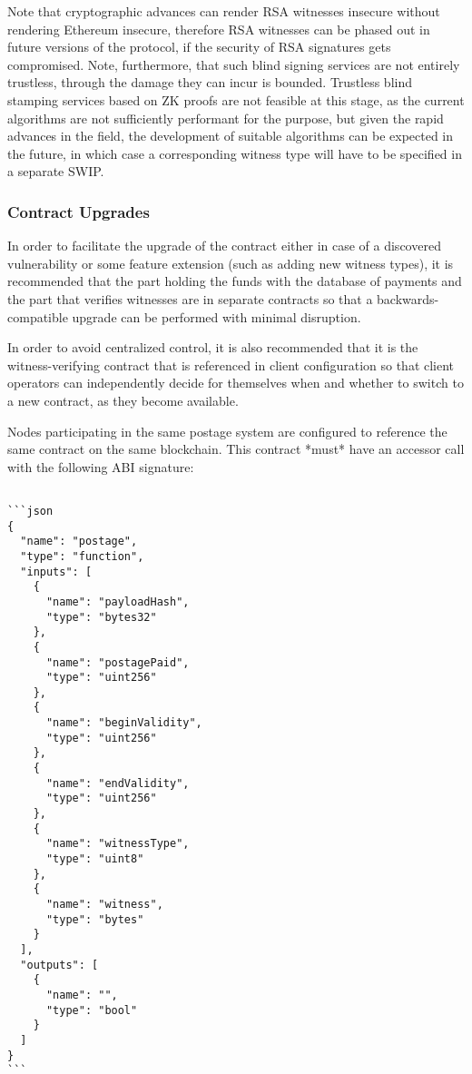 Note that cryptographic advances can render RSA witnesses insecure without rendering Ethereum insecure, therefore RSA witnesses can be phased out in future versions of the protocol, if the security of RSA signatures gets compromised. Note, furthermore, that such blind signing services are not entirely trustless, through the damage they can incur is bounded. Trustless blind stamping services based on ZK proofs are not feasible at this stage, as the current algorithms are not sufficiently performant for the purpose, but given the rapid advances in the field, the development of suitable algorithms can be expected in the future, in which case a corresponding witness type will have to be specified in a separate SWIP.

\subsubsection{Contract Upgrades}

In order to facilitate the upgrade of the contract either in case of a discovered vulnerability or some feature extension (such as adding new witness types), it is recommended that the part holding the funds with the database of payments and the part that verifies witnesses are in separate contracts so that a backwards-compatible upgrade can be performed with minimal disruption.

In order to avoid centralized control, it is also recommended that it is the witness-verifying contract that is referenced in client configuration so that client operators can independently decide for themselves when and whether to switch to a new contract, as they become available.


Nodes participating in the same postage system are configured to reference the same contract on the same blockchain. This contract
*must* have an accessor call with the following ABI signature:

\begin{lstlisting}

```json
{
  "name": "postage",
  "type": "function",
  "inputs": [
    {
      "name": "payloadHash",
      "type": "bytes32"
    },
    {
      "name": "postagePaid",
      "type": "uint256"
    },
    {
      "name": "beginValidity",
      "type": "uint256"
    },
    {
      "name": "endValidity",
      "type": "uint256"
    },
    {
      "name": "witnessType",
      "type": "uint8"
    },
    {
      "name": "witness",
      "type": "bytes"
    }
  ],
  "outputs": [
    {
      "name": "",
      "type": "bool"
    }
  ]
}
```

\end{lstlisting}

